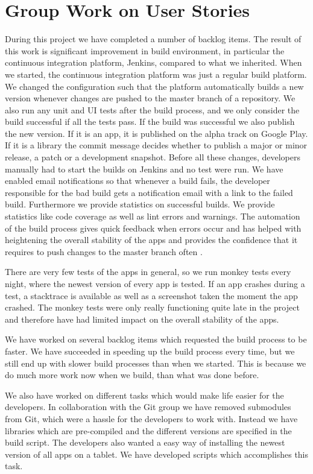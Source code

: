 \section{Group Work on User Stories}\label{conc:userstories}
During this project we have completed a number of backlog items. The result of this work is significant improvement in build environment, in particular the continuous integration platform, Jenkins, compared to what we inherited. When we started, the continuous integration platform was just a regular build platform. We changed the configuration such that the platform automatically builds a new version whenever changes are pushed to the master branch of a repository. We also run any unit and UI tests after the build process, and we only consider the build successful if all the tests pass. If the build was successful we also publish the new version. If it is an app, it is published on the alpha track on Google Play. If it is a library the commit message decides whether to publish a major or minor release, a patch or a development snapshot. Before all these changes, developers manually had to start the builds on Jenkins and no test were run. We have enabled email notifications so that whenever a build fails, the developer responsible for the bad build gets a notification email with a link to the failed build. Furthermore we provide statistics on successful builds. We provide statistics like code coverage as well as lint errors and warnings. The automation of the build process gives quick feedback when errors occur and has helped with heightening the overall stability of the apps and provides the confidence that it requires to push changes to the master branch often .

There are very few tests of the apps in general, so we run monkey tests every night, where the newest version of every app is tested. If an app crashes during a test, a stacktrace is available as well as a screenshot taken the moment the app crashed. The monkey tests were only really functioning quite late in the project and therefore have had limited impact on the overall stability of the apps.

We have worked on several backlog items which requested the build process to be faster. We have succeeded in speeding up the build process every time, but we still end up with slower build processes than when we started. This is because we do much more work now when we build, than what was done before.

We also have worked on different tasks which would make life easier for the developers. In collaboration with the Git group we have removed submodules from Git, which were a hassle for the developers to work with. Instead we have libraries which are pre-compiled and the different versions are specified in the build script. The developers also wanted a easy way of installing the newest version of all apps on a tablet. We have developed scripts which accomplishes this task.

